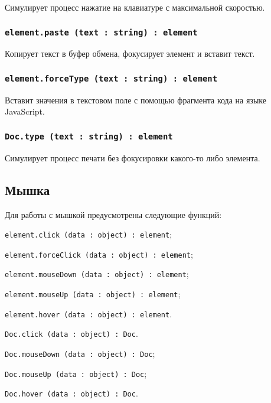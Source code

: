 Симулирует процесс нажатие на клавиатуре с максимальной скоростью.

\subsubsection{\texttt{element.paste (text : string) : element}}

Копирует текст в буфер обмена, фокусирует элемент и вставит текст.

\subsubsection{\texttt{element.forceType (text : string) : element}}

Вставит значения в текстовом поле с помощью фрагмента кода на языке JavaScript.

\subsubsection{\texttt{Doc.type (text : string) : element}}

Симулирует процесс печати без фокусировки какого-то либо элемента.

\subsection{Мышка}
\label{mouse}

Для работы с мышкой предусмотрены следующие функций:
\begin{icItems}
	\item \texttt{element.click (data : object) : element};
	\item \texttt{element.forceClick (data : object) : element};
	\item \texttt{element.mouseDown (data : object) : element};
	\item \texttt{element.mouseUp (data : object) : element};
	\item \texttt{element.hover (data : object) : element}.
	\item \texttt{Doc.click (data : object) : Doc}.
	\item \texttt{Doc.mouseDown (data : object) : Doc};
	\item \texttt{Doc.mouseUp (data : object) : Doc};
	\item \texttt{Doc.hover (data : object) : Doc}.
\end{icItems}

